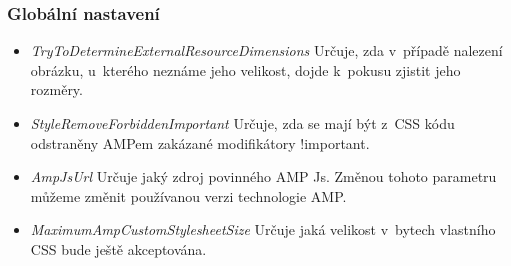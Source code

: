 \subsubsection{Globální nastavení}
\begin{itemize}
    \item \textit{TryToDetermineExternalResourceDimensions} \newline
    Určuje, zda v~případě nalezení obrázku, u~kterého neznáme jeho velikost, dojde k~pokusu zjistit jeho rozměry.
    \item \textit{StyleRemoveForbiddenImportant}\newline
    Určuje, zda se mají být z~CSS kódu odstraněny AMPem zakázané modifikátory !important.
    \item \textit{AmpJsUrl}\newline
    Určuje jaký zdroj povinného AMP Js. Změnou tohoto parametru můžeme změnit používanou verzi technologie AMP.
    \item \textit{MaximumAmpCustomStylesheetSize}\newline
    Určuje jaká velikost v~bytech vlastního CSS bude ještě akceptována.
\end{itemize}


